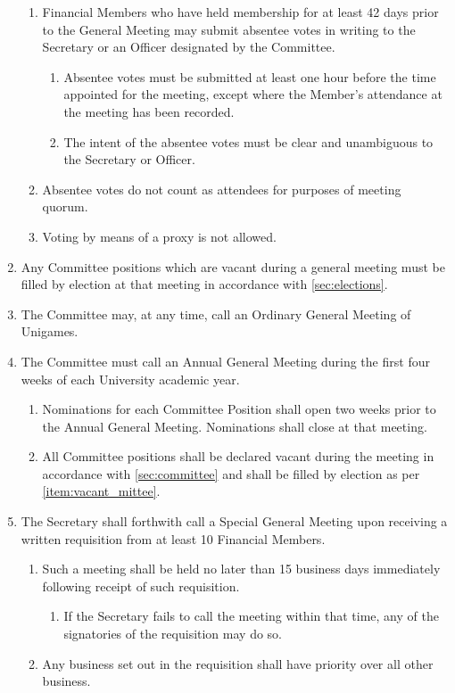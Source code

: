 \documentclass[a4paper]{article}
\begin{document}
\begin{enumerate}
    \begin{enumerate}
        \item Financial Members who have held membership for at least 42 days prior to the General Meeting may submit absentee votes in writing to the Secretary or an Officer designated by the Committee.
        \begin{enumerate}
            \item Absentee votes must be submitted at least one hour before the time appointed for the meeting, except where the Member's attendance at the meeting has been recorded.
            \item The intent of the absentee votes must be clear and unambiguous to the Secretary or Officer.
        \end{enumerate}
        \item Absentee votes do not count as attendees for purposes of meeting quorum.
        \item Voting by means of a proxy is not allowed.
    \end{enumerate}
    \item \label{item:vacant_mittee} Any Committee positions which are vacant during a general meeting must be filled by election at that meeting in accordance with \cref{sec:elections}.
    \item The Committee may, at any time, call an Ordinary General Meeting of Unigames.
    \item The Committee must call an Annual General Meeting during the first four weeks of each University academic year.
    \begin{enumerate}
        \item Nominations for each Committee Position shall open two weeks prior to the Annual General Meeting. Nominations shall close at that meeting.
        \item All Committee positions shall be declared vacant during the meeting in accordance with \cref{sec:committee} and shall be filled by election as per \cref{item:vacant_mittee}.
    \end{enumerate}
    \item The Secretary shall forthwith call a Special General Meeting upon receiving a written requisition from at least 10 Financial Members.
          \begin{enumerate}
              \item Such a meeting shall be held no later than 15 business days immediately following receipt of such requisition.
                    \begin{enumerate}
                        \item If the Secretary fails to call the meeting within that time, any of the signatories of the requisition may do so.
                    \end{enumerate}
              \item \label{item:sgm_business_priority} Any business set out in the requisition shall have priority over all other business.
          \end{enumerate}
\end{enumerate}
\end{document}
